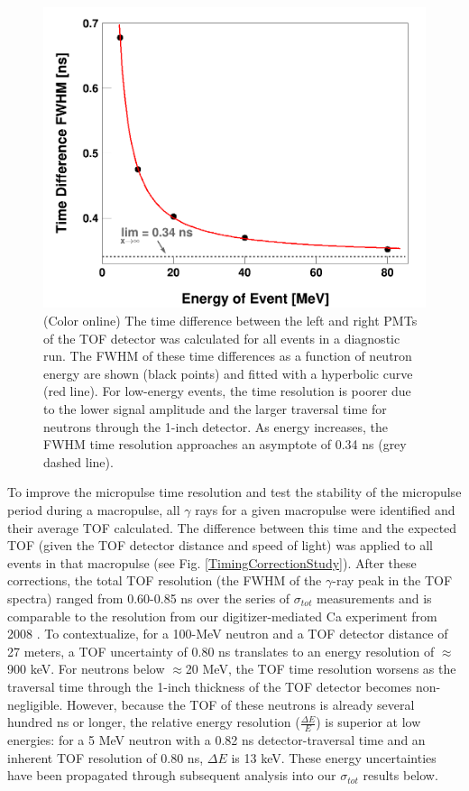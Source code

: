 \documentclass[twocolumn,secnumarabic,amssymb, nobibnotes, aps, prl,
superscriptaddress, nobalancelastpage]{revtex4}
\newcommand{\tots}{\ensuremath{\sigma_{tot}}\,\,}
\begin{document}
\begin{figure}
    \includegraphics[scale=0.3]{figures/DifferenceThresholdsFit.png}
    \caption{(Color online) The time difference between the left and right PMTs
        of the TOF detector was calculated for all events in a diagnostic run.
        The FWHM of these time differences as a function of
        neutron energy are shown (black points) and fitted with a hyperbolic
        curve (red line). For low-energy
        events, the time resolution is poorer due to the lower signal amplitude and
        the larger traversal time for neutrons through the 1-inch detector. As energy
        increases, the FWHM time resolution approaches an asymptote of 0.34
    ns (grey dashed line).}
    \label{DifferenceThresholdsFit}
\end{figure}

To improve the micropulse time resolution and test the stability of the
micropulse period during a macropulse, all $\gamma$ rays for a given macropulse
were identified and their average TOF calculated. The difference between this
time and the expected TOF (given the TOF detector distance and speed of light)
was applied to all events in that macropulse (see Fig.
\ref{TimingCorrectionStudy}). After these corrections, the total TOF resolution
(the FWHM of the $\gamma$-ray peak in the TOF spectra) ranged from
0.60-0.85 ns over the series of \tots measurements and is comparable to the resolution from 
our digitizer-mediated Ca experiment from 2008 \cite{Shane2010}.
To contextualize, for a 100-MeV neutron and a TOF detector distance of 27 meters, a TOF 
uncertainty of 0.80 ns translates to an energy resolution of $\approx$900 keV.
For neutrons below $\approx$20 MeV, the TOF time resolution worsens as the traversal time 
through the 1-inch thickness of the TOF detector becomes non-negligible.
However, because the TOF of these neutrons is already several hundred ns or
longer, the relative energy resolution ($\frac{\Delta E}{E}$) is
superior at low energies: for a 5 MeV neutron with a 0.82 ns detector-traversal time and
an inherent TOF resolution of 0.80 ns, $\Delta E$ is 13 keV. These energy uncertainties
have been propagated through subsequent analysis into our \tots results below.
\end{document}
